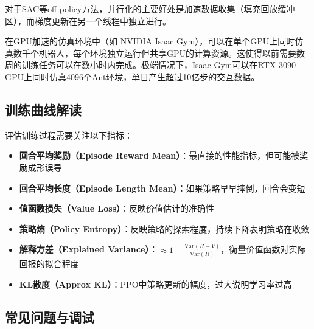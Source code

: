 对于SAC等off-policy方法，并行化的主要好处是加速数据收集（填充回放缓冲区），而梯度更新在另一个线程中独立进行。

\begin{remark}
在GPU加速的仿真环境中（如 NVIDIA Isaac Gym），可以在单个GPU上同时仿真数千个机器人，每个环境独立运行但共享GPU的计算资源。这使得以前需要数周的训练任务可以在数小时内完成。极端情况下，Isaac Gym可以在RTX 3090 GPU上同时仿真4096个Ant环境，单日产生超过10亿步的交互数据。
\end{remark}

\subsection{训练曲线解读}

评估训练过程需要关注以下指标：

\begin{itemize}
    \item \textbf{回合平均奖励（Episode Reward Mean）}：最直接的性能指标，但可能被奖励成形误导
    \item \textbf{回合平均长度（Episode Length Mean）}：如果策略早早摔倒，回合会变短
    \item \textbf{值函数损失（Value Loss）}：反映价值估计的准确性
    \item \textbf{策略熵（Policy Entropy）}：反映策略的探索程度，持续下降表明策略在收敛
    \item \textbf{解释方差（Explained Variance）}：$\approx 1 - \frac{\text{Var}(R - V)}{\text{Var}(R)}$，衡量价值函数对实际回报的拟合程度
    \item \textbf{KL散度（Approx KL）}：PPO中策略更新的幅度，过大说明学习率过高
\end{itemize}

\subsection{常见问题与调试}

